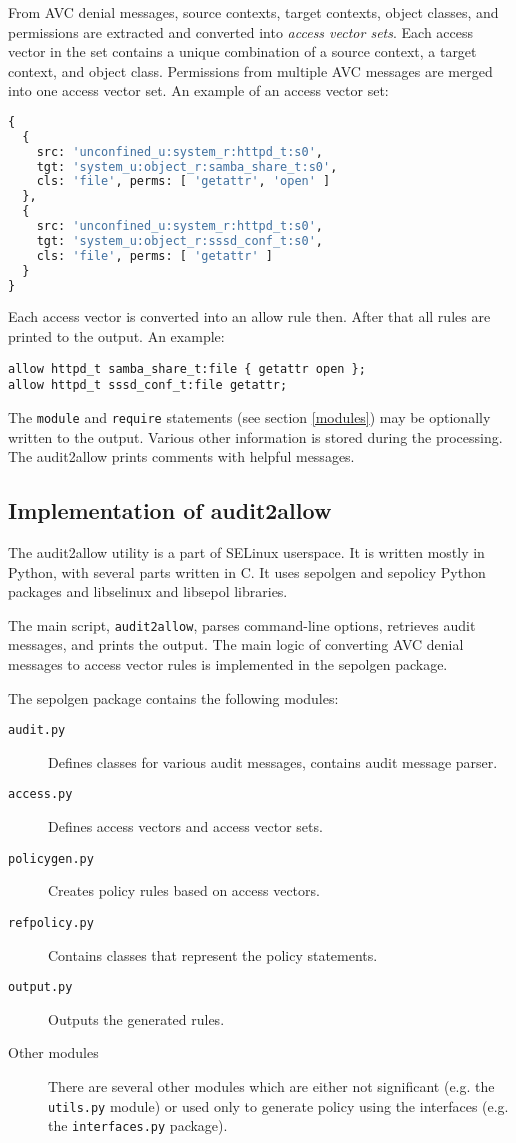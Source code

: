 From AVC denial messages, source contexts, target contexts, object classes, and
permissions are extracted and converted into \emph{access vector sets}. Each
access vector in the set contains a unique combination of a source context, a
target context, and object class. Permissions from multiple AVC messages are
merged into one access vector set. An example of an access vector set:
\begin{lstlisting}[language=Python]
{
  {
    src: 'unconfined_u:system_r:httpd_t:s0',
    tgt: 'system_u:object_r:samba_share_t:s0',
    cls: 'file', perms: [ 'getattr', 'open' ]
  },
  {
    src: 'unconfined_u:system_r:httpd_t:s0',
    tgt: 'system_u:object_r:sssd_conf_t:s0',
    cls: 'file', perms: [ 'getattr' ]
  }
}
\end{lstlisting}

Each access vector is converted into an allow rule then. After that all rules
are printed to the output. An example:
\begin{lstlisting}
allow httpd_t samba_share_t:file { getattr open };
allow httpd_t sssd_conf_t:file getattr;
\end{lstlisting}
The \texttt{module} and \texttt{require} statements (see section \ref{modules})
may be optionally written to the output. Various other information is stored
during the processing. The audit2allow prints comments with helpful messages.

\subsection{Implementation of audit2allow}
\label{implementation}
The audit2allow utility is a part of SELinux userspace. It is written mostly in
Python, with several parts written in C. It uses sepolgen and sepolicy Python
packages and libselinux and libsepol libraries.

The main script, \texttt{audit2allow}, parses command-line options, retrieves
audit messages, and prints the output. The main logic of converting AVC denial
messages to access vector rules is implemented in the sepolgen package.

The sepolgen package contains the following modules:
\begin{description}
    \item [\texttt{audit.py}] Defines classes for various audit messages,
        contains audit message parser.
    \item [\texttt{access.py}] Defines access vectors and access vector sets.
    \item [\texttt{policygen.py}] Creates policy rules based on access vectors.
    \item [\texttt{refpolicy.py}] Contains classes that represent the policy
        statements.
    \item [\texttt{output.py}] Outputs the generated rules.
    \item [Other modules] There are several other modules which are either not
        significant (e.g. the \texttt{utils.py} module) or used only to
        generate policy using the interfaces (e.g. the \texttt{interfaces.py}
        package).
\end{description}

